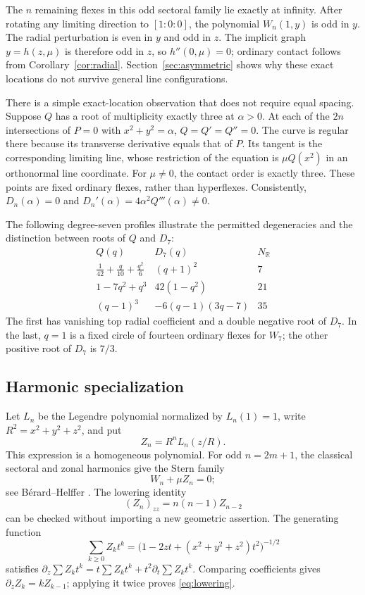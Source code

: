 \documentclass[11pt,a4paper]{article}
\theoremstyle{remark}
\newcommand{\R}{\mathbb R}
\begin{document}
The \(n\) remaining flexes in this odd sectoral family lie
exactly at infinity. After rotating any limiting direction to
\([1:0:0]\), the polynomial \(W_n(1,y)\) is odd in \(y\).
The radial perturbation is even in \(y\) and odd in \(z\).
The implicit graph \(y=h(z,\mu)\) is therefore odd in \(z\),
so \(h''(0,\mu)=0\); ordinary contact follows from
Corollary~\ref{cor:radial}. Section~\ref{sec:asymmetric}
shows why these exact locations do not survive general
line configurations.

There is a simple exact-location observation that does not
require equal spacing. Suppose \(Q\) has a root of multiplicity
exactly three at \(\alpha>0\). At each of the \(2n\) intersections
of \(P=0\) with \(x^2+y^2=\alpha\), \(Q=Q'=Q''=0\).
The curve is regular there because its transverse derivative
equals that of \(P\). Its tangent is the corresponding
limiting line, whose restriction of the equation is
\(\mu Q(x^2)\) in an orthonormal line coordinate. For
\(\mu\ne0\), the contact order is exactly three. These points
are fixed ordinary flexes, rather than hyperflexes. Consistently,
\(D_n(\alpha)=0\) and
\(D_n'(\alpha)=4\alpha^2Q'''(\alpha)\ne0\).

The following degree-seven profiles illustrate the permitted
degeneracies and the distinction between roots of \(Q\) and \(D_7\):
\begingroup
\renewcommand{\arraystretch}{1.35}
\[
\begin{array}{c|c|c}
 Q(q)&D_7(q)&N_{\R}\\ \hline
 \frac1{42}+\frac q{10}+\frac{q^2}{6}&(q+1)^2&7\\
 1-7q^2+q^3&42(1-q^2)&21\\
 (q-1)^3&-6(q-1)(3q-7)&35
\end{array}
\]
\endgroup
The first has vanishing top radial coefficient and a double
negative root of \(D_7\). In the last, \(q=1\) is a fixed
circle of fourteen ordinary flexes for \(W_7\); the other
positive root of \(D_7\) is \(7/3\).

\subsection{Harmonic specialization}

Let \(L_n\) be the Legendre polynomial normalized by \(L_n(1)=1\),
write \(R^2=x^2+y^2+z^2\), and put
\[
 Z_n=R^nL_n(z/R).
\]
This expression is a homogeneous polynomial. For odd \(n=2m+1\),
the classical sectoral and zonal harmonics give the Stern family
\begin{equation}\label{eq:stern}
                         W_n+\mu Z_n=0;
\end{equation}
see B\'erard--Helffer \citep{berardhelffer}.
The lowering identity
\begin{equation}\label{eq:lowering}
                  (Z_n)_{zz}=n(n-1)Z_{n-2}
\end{equation}
can be checked without importing a new geometric assertion.
The generating function
\[
 \sum_{k\geq0}Z_kt^k
  =\bigl(1-2zt+(x^2+y^2+z^2)t^2\bigr)^{-1/2}
\]
satisfies
\(\partial_z\sum Z_kt^k=t\sum Z_kt^k+
t^2\partial_t\sum Z_kt^k\).
Comparing coefficients gives \(\partial_zZ_k=kZ_{k-1}\);
applying it twice proves \eqref{eq:lowering}.
\end{document}
